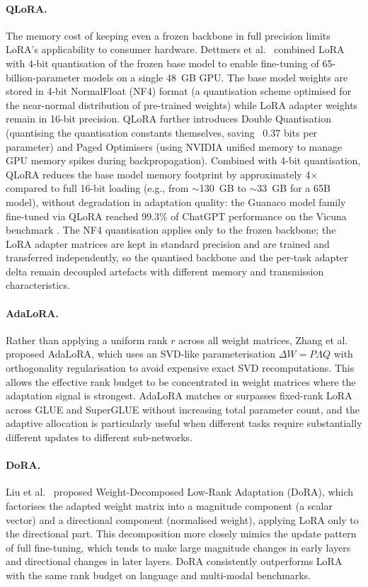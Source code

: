 \paragraph{QLoRA.}
The memory cost of keeping even a frozen backbone in full precision limits LoRA's applicability to consumer hardware. Dettmers et al.~\cite{Dettmers2023} combined LoRA with 4-bit quantisation of the frozen base model to
enable fine-tuning of 65-billion-parameter models on a single 48~GB GPU. The base model
weights are stored in 4-bit NormalFloat (NF4) format  (a quantisation scheme optimised
for the near-normal distribution of pre-trained weights) while LoRA adapter weights
remain in 16-bit precision. QLoRA further introduces Double Quantisation (quantising
the quantisation constants themselves, saving ~0.37 bits per parameter) and Paged
Optimisers (using NVIDIA unified memory to manage GPU memory spikes during
backpropagation). Combined with 4-bit quantisation, QLoRA reduces the base model memory footprint by approximately 4$\times$ compared to full 16-bit loading (e.g., from $\sim$130~GB to $\sim$33~GB for a 65B model), without degradation in adaptation quality: the
Guanaco model family fine-tuned via QLoRA reached 99.3\% of ChatGPT performance on the
Vicuna benchmark \cite{Dettmers2023}. The NF4 quantisation applies only to the frozen
backbone; the LoRA adapter matrices are kept in standard precision and are trained and
transferred independently, so the quantised backbone and the per-task adapter delta
remain decoupled artefacts with different memory and transmission characteristics.

\paragraph{AdaLoRA.}
Rather than applying a uniform rank $r$ across all weight matrices, Zhang et al.~\cite{ZhangAdaLoRA2023}
proposed AdaLoRA, which uses an SVD-like parameterisation
$\Delta W = P \Lambda Q$ with orthogonality regularisation to avoid expensive exact SVD
recomputations. This allows the effective rank budget to be concentrated in weight
matrices where the adaptation signal is strongest. AdaLoRA matches or surpasses fixed-rank
LoRA across GLUE and SuperGLUE without increasing total parameter count, and the
adaptive allocation is particularly useful when different tasks require substantially
different updates to different sub-networks.

\paragraph{DoRA.}
Liu et al.~\cite{LiuDoRA2024} proposed Weight-Decomposed Low-Rank Adaptation (DoRA), which
factorises the adapted weight matrix into a magnitude component (a scalar vector) and
a directional component (normalised weight), applying LoRA only to the directional part.
This decomposition more closely mimics the update pattern of full fine-tuning, which tends
to make large magnitude changes in early layers and directional changes in later layers.
DoRA consistently outperforms LoRA with the same rank budget on language and multi-modal
benchmarks.

